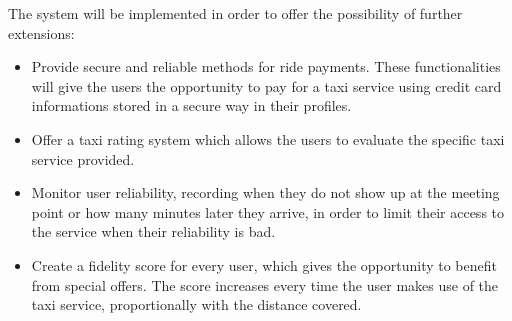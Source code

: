 The system will be implemented in order to offer the possibility of further extensions:

\begin{itemize}
\item Provide secure and reliable methods for ride payments. These functionalities will give the users the opportunity to pay for a taxi service using credit card informations stored in a secure way in their profiles.
\item Offer a taxi rating system which allows the users to evaluate the specific taxi service provided.
\item Monitor user reliability, recording when they do not show up at the meeting point or how many minutes later they arrive, in order to limit their access to the service when their reliability is bad.
\item Create a fidelity score for every user, which gives the opportunity to benefit from special offers. The score increases every time the user makes use of the taxi service, proportionally with the distance covered. 
\end{itemize}